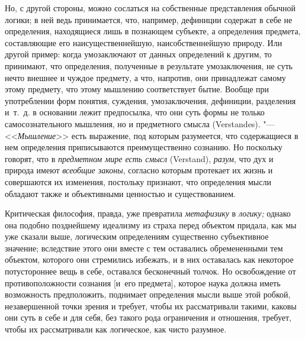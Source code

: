 Но, с другой стороны, можно сослаться на собственные представления обычной
логики; в ней ведь принимается, что, например, дефиниции содержат в себе не
определения, находящиеся лишь в познающем субъекте, а определения предмета,
составляющие его наисущественнейшую, наисобственнейшую природу. Или другой
пример: когда умозаключают от данных определений к другим, то принимают,
что определения, полученные в результате умозаключения, не суть нечто
внешнее и чуждое предмету, а что, напротив, они принадлежат самому этому
предмету, что этому мышлению соответствует бытие. Вообще при употреблении
форм понятия, суждения, умозаключения, дефиниции, разделения и~т.~д. в
основании лежит предпосылка, что они суть формы не только самосознательного
мышления, но и предметного смысла (Verstandes). "---
<<{\em Мышление}>> есть выражение, под которым
разумеется, что содержащиеся в нем определения приписываются
преимущественно сознанию. Но поскольку говорят, что в
{\em предметном мире есть смысл} (Verstand),
{\em разум}, что дух и природа имеют
{\em всеобщие законы}, согласно которым протекает их
жизнь и совершаются их изменения, постольку признают, что определения мысли
обладают также и объективными ценностью и существованием.

Критическая философия, правда, уже превратила
{\em метафизику} в {\em логику;}
однако она подобно позднейшему
идеализму
из страха перед объектом придала, как мы уже сказали выше, логическим
определениям существенно субъективное значение; вследствие этого они вместе
с тем оставались обремененными тем объектом, которого они стремились
избежать, и в них оставалась как некоторое потустороннее вещь в себе,
оставался бесконечный толчок. Но освобождение от противоположности сознания
[и~его предмета], которое наука должна иметь возможность предположить,
поднимает определения мысли выше этой робкой, незавершенной точки зрения и
требует, чтобы их рассматривали такими, каковы они суть в себе и для себя,
без такого рода ограничения и отношения, требует, чтобы их рассматривали
как логическое, как чисто разумное.

